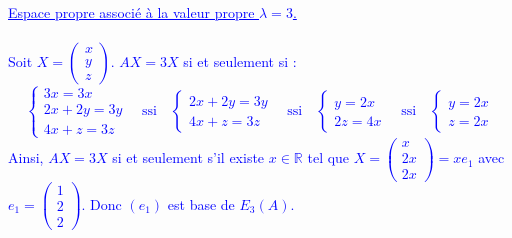 \documentclass[a4paper,12pt]{article}
\begin{document}
\textcolor{blue}{
\underline{Espace propre associé à la valeur propre $\lambda = 3$.} \\ \\
Soit $X =
\begin{pmatrix}
x \\
y \\
z
\end{pmatrix}
$. $AX = 3X$ si et seulement si :
\[
\begin{cases}
3x = 3x \\
2x + 2y = 3y \\
4x + z = 3z
\end{cases}
\quad \text{ssi} \quad
\begin{cases}
2x + 2y = 3y \\
4x + z = 3z
\end{cases}
\quad \text{ssi} \quad
\begin{cases}
y = 2x \\
2z = 4x
\end{cases}
\quad \text{ssi} \quad
\begin{cases}
y = 2x \\
z = 2x
\end{cases}
\]
Ainsi, $AX = 3X$ si et seulement s'il existe $x \in \mathbb{R}$ tel que $X =
\begin{pmatrix}
x \\
2x \\
2x
\end{pmatrix} = x e_1
$ avec $e_1 =
\begin{pmatrix}
1 \\
2 \\
2
\end{pmatrix}$.
Donc $(e_1)$ est base de $E_3(A)$.}
\\
\end{document}
